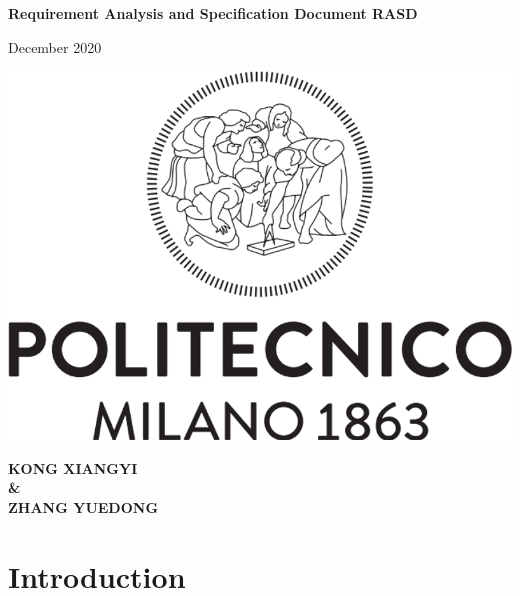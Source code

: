\documentclass[a4paper,12pt]{report}
\begin{document}
 


\begin{titlepage}
	\begin{center}
		\vspace*{1cm}
		
		\Huge
		\textbf{Requirement Analysis and Specification Document RASD}
		
		\vspace{0.5cm}
		\LARGE
		December 2020
		
		\vspace{1.5cm}
		
		
		\vfill
			
		\includegraphics[scale=0.7]{PolimiLogo}
		
		\vfill
		
		
		\normalsize
		\textbf{KONG XIANGYI} \\
		\textbf{\&} \\
		\textbf{ZHANG YUEDONG}
		
	\end{center}
\end{titlepage}

\tableofcontents



\chapter{Introduction} \label{C1:Introduction}
\end{document}
